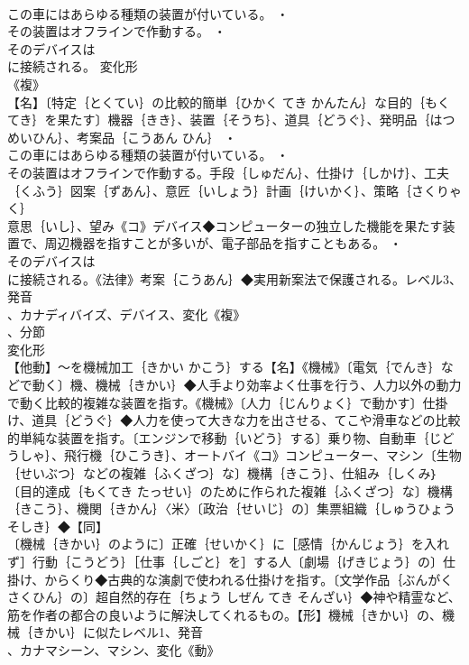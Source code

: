 \documentclass[8pt]{extreport}
\begin{document}
\begin{CJK}{UTF8}{min}
\\	この車にはあらゆる種類の装置が付いている。 ・
\\	その装置はオフラインで作動する。 ・
\\	そのデバイスは
\\	に接続される。	変化形 
\\	《複》
\\	【名】〔特定｛とくてい｝の比較的簡単｛ひかく てき かんたん｝な目的｛もくてき｝を果たす〕機器｛きき｝、装置｛そうち｝、道具｛どうぐ｝、発明品｛はつめいひん｝、考案品｛こうあん ひん｝ ・
\\	この車にはあらゆる種類の装置が付いている。 ・
\\	その装置はオフラインで作動する。手段｛しゅだん｝、仕掛け｛しかけ｝、工夫｛くふう｝図案｛ずあん｝、意匠｛いしょう｝計画｛けいかく｝、策略｛さくりゃく｝
\\	意思｛いし｝、望み《コ》デバイス◆コンピューターの独立した機能を果たす装置で、周辺機器を指すことが多いが、電子部品を指すこともある。 ・
\\	そのデバイスは
\\	に接続される。《法律》考案｛こうあん｝◆実用新案法で保護される。レベル3、発音
\\	、カナディバイズ、デバイス、変化《複》
\\	、分節
\\	変化形 
\\	【他動】～を機械加工｛きかい かこう｝する【名】《機械》〔電気｛でんき｝などで動く〕機、機械｛きかい｝◆人手より効率よく仕事を行う、人力以外の動力で動く比較的複雑な装置を指す。《機械》〔人力｛じんりょく｝で動かす〕仕掛け、道具｛どうぐ｝◆人力を使って大きな力を出させる、てこや滑車などの比較的単純な装置を指す。〔エンジンで移動｛いどう｝する〕乗り物、自動車｛じどうしゃ｝、飛行機｛ひこうき｝、オートバイ《コ》コンピューター、マシン〔生物｛せいぶつ｝などの複雑｛ふくざつ｝な〕機構｛きこう｝、仕組み｛しくみ｝〔目的達成｛もくてき たっせい｝のために作られた複雑｛ふくざつ｝な〕機構｛きこう｝、機関｛きかん｝〈米〉〔政治｛せいじ｝の〕集票組織｛しゅうひょう そしき｝◆【同】
\\	〔機械｛きかい｝のように〕正確｛せいかく｝に［感情｛かんじょう｝を入れず］行動｛こうどう｝［仕事｛しごと｝を］する人〔劇場｛げきじょう｝の〕仕掛け、からくり◆古典的な演劇で使われる仕掛けを指す。〔文学作品｛ぶんがく さくひん｝の〕超自然的存在｛ちょう しぜん てき そんざい｝◆神や精霊など、筋を作者の都合の良いように解決してくれるもの。【形】機械｛きかい｝の、機械｛きかい｝に似たレベル1、発音
\\	、カナマシーン、マシン、変化《動》

\end{CJK}
\end{document}

